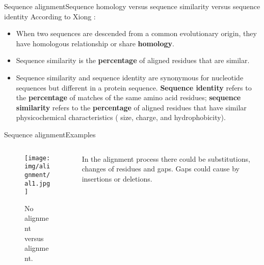 \documentclass[10pt]{beamer}
\newcommand{\1}{
	\setbeamertemplate{background}{
		\texttt{[image: img/1]}
		\tikz[overlay] \fill[fill opacity=0.75,fill=white] (0,0) rectangle (-\paperwidth,\paperheight);
	}
}
\begin{document}
\begin{frame}{Sequence alignment}{Sequence homology versus sequence similarity versus sequence identity}
According to Xiong \cite{xiong2006essential}:
\begin{itemize}
    \item When two sequences are descended from a common evolutionary origin, they have 
homologous relationship or share \textbf{homology}.
    \item Sequence similarity is the \textbf{percentage} of aligned residues that are similar.
    \item Sequence similarity and sequence identity are synonymous for nucleotide sequences but different in a protein sequence. \textbf{Sequence identity} refers to the \textbf{percentage} of matches of the same amino acid residues; \textbf{sequence similarity} refers to the \textbf{percentage} of aligned residues that have similar physicochemical characteristics ( size, charge, and hydrophobicity).

\end{itemize}
\end{frame}


\begin{frame}{Sequence alignment}{Examples}
\begin{columns}
	\begin{column}{0.48\textwidth}
		\begin{figure}[]
			\centering
			\texttt{[image: img/alignment/al1.jpg]}
			\label{img:alig}
			\caption{No alignment versus alignment.}
		\end{figure}
	\end{column}
	\begin{column}{0.48\textwidth}
		In the alignment process there could be substitutions, changes of residues and gaps. Gaps could cause by insertions or deletions.
	\end{column}
\end{columns}
\end{frame}
\end{document}
